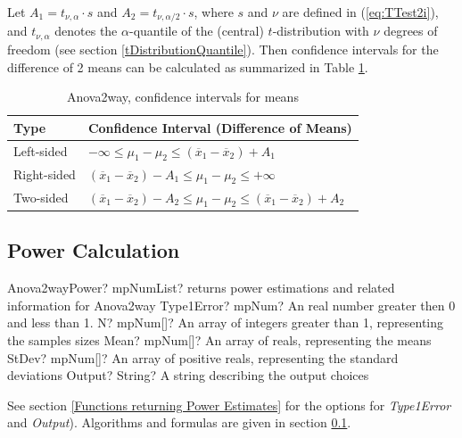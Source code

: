 \vspace{0.3cm}
Let $A_1=t_{\nu,\alpha} \cdot s$ and $A_2=t_{\nu,\alpha/2} \cdot s$, where $s$ and $\nu$ are defined in (\ref{eq:TTest2i}), and $t_{\nu,\alpha}$ denotes the $\alpha$-quantile of the (central) $t$-distribution with $\nu$ degrees of freedom (see section \ref{tDistributionQuantile}). Then confidence intervals for the difference of 2 means can be calculated as summarized in Table \ref{Anova2way, CI}.

\begin{table}[ht]
	\centering
	\begin{tabular}{|l|l|}
		\hline
		Type & Confidence Interval (Difference of Means)\\
		\hline
		Left-sided &  $-\infty \leq \mu_1 - \mu_2 \leq (\overline{x}_1-\overline{x}_2) + A_1$ \\
		Right-sided &  $(\overline{x}_1-\overline{x}_2) - A_1 \leq \mu_1 - \mu_2 \leq +\infty$\\
		Two-sided & $(\overline{x}_1-\overline{x}_2) - A_2 \leq \mu_1 - \mu_2 \leq (\overline{x}_1-\overline{x}_2) + A_2$ \\
		\hline
	\end{tabular}
	\caption{Anova2way, confidence intervals for means}
	\label{Anova2way, CI}
\end{table}


\subsection{Power Calculation}
\label{Anova2way_Power}


\begin{mpFunctionsExtract}
	\mpFunctionFiveNotImplemented
	{Anova2wayPower? mpNumList? returns power estimations and related information for Anova2way}
	{Type1Error? mpNum? An real number greater then 0 and less than 1.}
	{N? mpNum[]? An array of integers greater than 1, representing the samples sizes}
	{Mean? mpNum[]? An array of reals, representing the means}
	{StDev? mpNum[]? An array of positive reals, representing the standard deviations}
	{Output? String? A string describing the output choices}
\end{mpFunctionsExtract}

\vspace{0.3cm}
See section \ref{Functions returning Power Estimates} for the options for {\itshape\sffamily Type1Error} and {\itshape\sffamily Output}). Algorithms and formulas are given in section \ref{Anova2way_Power}.

